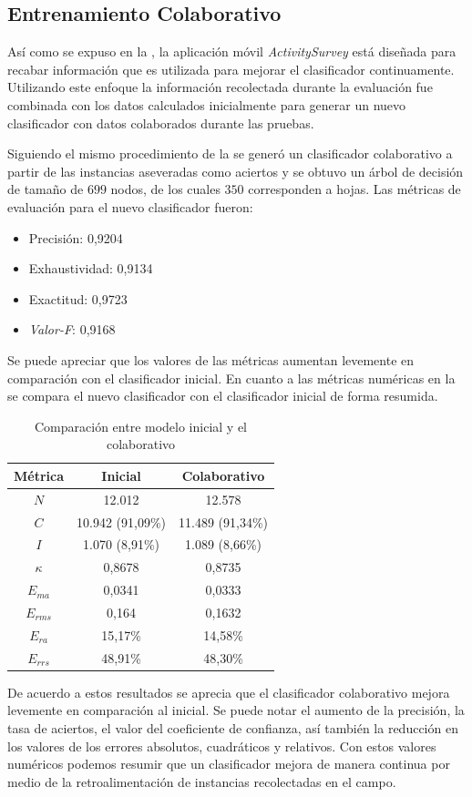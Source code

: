 \subsection{Entrenamiento Colaborativo}

Así como se expuso en la , la aplicación móvil
\emph{ActivitySurvey} está diseñada para recabar información que es
utilizada para mejorar el clasificador continuamente. Utilizando este
enfoque la información recolectada durante la evaluación fue combinada
con los datos calculados inicialmente para generar un nuevo clasificador
con datos colaborados durante las pruebas.

Siguiendo el mismo procedimiento de la 
se generó un clasificador colaborativo a partir de las instancias
aseveradas como aciertos y se obtuvo un árbol de decisión de tamaño
de $699$ nodos, de los cuales $350$ corresponden a hojas. Las métricas
de evaluación para el nuevo clasificador fueron:
\begin{itemize}
\item Precisión: 0,9204
\item Exhaustividad: 0,9134
\item Exactitud: 0,9723
\item \emph{Valor-F}: 0,9168
\end{itemize}
Se puede apreciar que los valores de las métricas aumentan levemente
en comparación con el clasificador inicial. En cuanto a las métricas
numéricas en la  se compara el nuevo
clasificador con el clasificador inicial de forma resumida.

\begin{table}[H]
\begin{centering}
\begin{tabular}{|c|c|c|}
\hline 
Métrica & Inicial & Colaborativo\tabularnewline
\hline 
\hline 
$N$ & 12.012 & 12.578\tabularnewline
\hline 
$C$ & 10.942 (91,09\%) & 11.489 (91,34\%)\tabularnewline
\hline 
$I$ & 1.070 (8,91\%) & 1.089 (8,66\%)\tabularnewline
\hline 
$\kappa$ & 0,8678 & 0,8735\tabularnewline
\hline 
$E_{ma}$ & 0,0341 & 0,0333\tabularnewline
\hline 
$E_{rms}$ & 0,164 & 0,1632\tabularnewline
\hline 
$E_{ra}$ & 15,17\% & 14,58\%\tabularnewline
\hline 
$E_{rrs}$ & 48,91\% & 48,30\%\tabularnewline
\hline 
\end{tabular}
\par\end{centering}
\caption{\label{tab6:comparacion-clasi}Comparación entre modelo inicial y
el colaborativo}
\end{table}

De acuerdo a estos resultados se aprecia que el clasificador colaborativo
mejora levemente en comparación al inicial. Se puede notar el aumento
de la precisión, la tasa de aciertos, el valor del coeficiente de
confianza, así también la reducción en los valores de los errores
absolutos, cuadráticos y relativos. Con estos valores numéricos podemos
resumir que un clasificador mejora de manera continua por medio de
la retroalimentación de instancias recolectadas en el campo.

